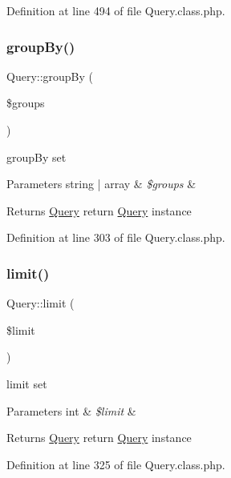 Definition at line 494 of file Query.\+class.\+php.

\hypertarget{classQuery_afeca4abb4534e8aa58db00dac98e7082}{}\label{classQuery_afeca4abb4534e8aa58db00dac98e7082} 
\subsubsection{\texorpdfstring{group\+By()}{groupBy()}}
{\footnotesize\ttfamily Query\+::group\+By (\begin{DoxyParamCaption}\item[{}]{\$groups }\end{DoxyParamCaption})}

group\+By set 
\begin{DoxyParams}[1]{Parameters}
string | array & {\em \$groups} & \\
\hline
\end{DoxyParams}
\begin{DoxyReturn}{Returns}
\hyperlink{classQuery}{Query} return \hyperlink{classQuery}{Query} instance 
\end{DoxyReturn}


Definition at line 303 of file Query.\+class.\+php.

\hypertarget{classQuery_af2e290d02d3e8c157f9b85b9da1ac08c}{}\label{classQuery_af2e290d02d3e8c157f9b85b9da1ac08c} 
\subsubsection{\texorpdfstring{limit()}{limit()}}
{\footnotesize\ttfamily Query\+::limit (\begin{DoxyParamCaption}\item[{}]{\$limit }\end{DoxyParamCaption})}

limit set 
\begin{DoxyParams}[1]{Parameters}
int & {\em \$limit} & \\
\hline
\end{DoxyParams}
\begin{DoxyReturn}{Returns}
\hyperlink{classQuery}{Query} return \hyperlink{classQuery}{Query} instance 
\end{DoxyReturn}


Definition at line 325 of file Query.\+class.\+php.

\hypertarget{classQuery_a47d03784bf5f79d270e0f56f9ada6560}{}\label{classQuery_a47d03784bf5f79d270e0f56f9ada6560} 

